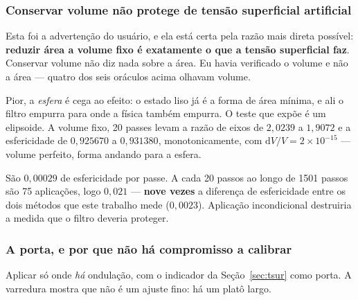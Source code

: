 \subsubsection{Conservar volume n\~ao protege de tens\~ao superficial
artificial}

Esta foi a adverten\c{c}\~ao do usu\'ario, e ela est\'a certa pela raz\~ao mais
direta poss\'ivel: \textbf{reduzir \'area a volume fixo \'e exatamente o que a
tens\~ao superficial faz}. Conservar volume n\~ao diz nada sobre a \'area. Eu
havia verificado o volume e n\~ao a \'area --- quatro dos seis or\'aculos acima
olhavam volume.

Pior, a \emph{esfera} \'e cega ao efeito: o estado liso j\'a \'e a forma de
\'area m\'inima, e ali o filtro empurra para onde a f\'isica tamb\'em empurra.
O teste que exp\~oe \'e um elipsoide. A volume fixo, 20 passes levam a raz\~ao
de eixos de $2{,}0239$ a $1{,}9072$ e a esfericidade de $0{,}925670$ a
$0{,}931380$, monotonicamente, com $\mathrm{d}V/V = 2\times10^{-15}$ --- volume
perfeito, forma andando para a esfera.

S\~ao $0{,}00029$ de esfericidade por passe. A cada 20 passos ao longo de 1501
passos s\~ao 75 aplica\c{c}\~oes, logo $0{,}021$ --- \textbf{nove vezes} a
diferen\c{c}a de esfericidade entre os dois m\'etodos que este trabalho mede
($0{,}0023$). Aplica\c{c}\~ao incondicional destruiria a medida que o filtro
deveria proteger.

\subsubsection{A porta, e por que n\~ao h\'a compromisso a calibrar}

Aplicar s\'o onde \emph{h\'a} ondula\c{c}\~ao, com o indicador da
Se\c{c}\~ao~\ref{sec:tsur} como porta. A varredura mostra que n\~ao \'e um
ajuste fino: h\'a um plat\^o largo.

\begin{table}[htbp]
\centering
\caption{Varredura do limiar. A segunda coluna tem de ficar muito abaixo de
$0{,}0023$; a \'ultima tem de ficar alta.}
\label{tab:tsur-limiar}
\small
\begin{adjustbox}{max width=\linewidth}
\end{adjustbox}
\end{table}

